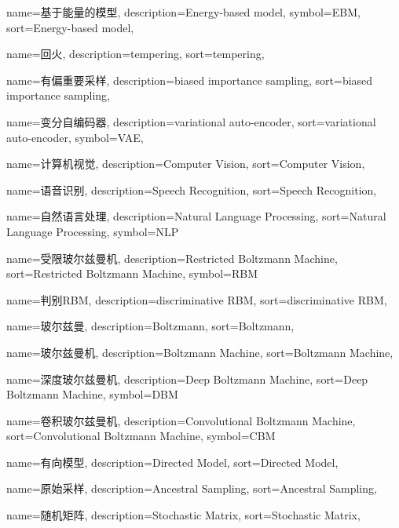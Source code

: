 {
  name=基于能量的模型,
  description={Energy-based model},
  symbol={EBM},
  sort={Energy-based model},
}

{
  name=回火,
  description={tempering},
  sort={tempering},
}

{
  name=有偏重要采样,
  description={biased importance sampling},
  sort={biased importance sampling},
}

{
  name=变分自编码器,
  description={variational auto-encoder},
  sort={variational auto-encoder},
  symbol={VAE},
}

{
  name=计算机视觉,
  description={Computer Vision},
  sort={Computer Vision},
}

{
  name=语音识别,
  description={Speech Recognition},
  sort={Speech Recognition},
}

{
  name=自然语言处理,
  description={Natural Language Processing},
  sort={Natural Language Processing},
  symbol={NLP}
}

{
  name=受限玻尔兹曼机,
  description={Restricted Boltzmann Machine},
  sort={Restricted Boltzmann Machine},
  symbol={RBM}
}

{
  name=判别RBM,
  description={discriminative RBM},
  sort={discriminative RBM},
}

{
  name=玻尔兹曼,
  description={Boltzmann},
  sort={Boltzmann},
}

{
  name=玻尔兹曼机,
  description={Boltzmann Machine},
  sort={Boltzmann Machine},
}

{
  name=深度玻尔兹曼机,
  description={Deep Boltzmann Machine},
  sort={Deep Boltzmann Machine},
  symbol={DBM}
}

{
  name=卷积玻尔兹曼机,
  description={Convolutional Boltzmann Machine},
  sort={Convolutional Boltzmann Machine},
  symbol={CBM}
}

{
  name=有向模型,
  description={Directed Model},
  sort={Directed Model},
}

{
  name=原始采样,
  description={Ancestral Sampling},
  sort={Ancestral Sampling},
}

{
  name=随机矩阵,
  description={Stochastic Matrix},
  sort={Stochastic Matrix},
}

